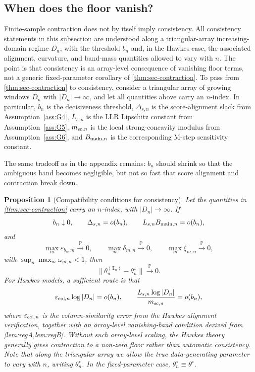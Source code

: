 \documentclass{statsoc}
\newtheorem{proposition}[proposition]{Proposition}
\newcommand{\1}{\mathbbm{1}}
\newcommand{\Tmax}{\mathfrak{T}}
\begin{document}
\subsection{When does the floor vanish?}\label{subsec:regimes}

Finite-sample contraction does not by itself imply consistency.  All consistency statements in this subsection are understood along a triangular-array increasing-domain regime \(D_n\), with the threshold \(b_n\) and, in the Hawkes case, the associated alignment, curvature, and band-mass quantities allowed to vary with \(n\). The point is that consistency is an array-level consequence of vanishing floor terms, not a generic fixed-parameter corollary of \cref{thm:sec-contraction}. To pass from \cref{thm:sec-contraction} to consistency, consider a triangular array of growing windows \(D_n\) with \(|D_n|\to\infty\), and let all quantities above carry an \(n\)-index. In particular, \(b_n\) is the decisiveness threshold, \(\Delta_{s,n}\) is the score-alignment slack from Assumption~\ref{ass:G4}, \(L_{s,n}\) is the LLR Lipschitz constant from Assumption~\ref{ass:G5}, \(m_{{\rm sc},n}\) is the local strong-concavity modulus from Assumption~\ref{ass:G6}, and \(B_{{\rm main},n}\) is the corresponding M-step sensitivity constant.

The same tradeoff as in the appendix remains: \(b_n\) should shrink so that the ambiguous band becomes negligible, but not so fast that score alignment and contraction break down.

\begin{proposition}[Compatibility conditions for consistency]\label{prop:compatibility}
Let the quantities in \cref{thm:sec-contraction} carry an \(n\)-index, with \(|D_n|\to\infty\). If
\[
b_n\downarrow 0,\qquad
\Delta_{s,n}=o(b_n),\qquad
L_{s,n}B_{{\rm main},n}=o(b_n),
\]
and
\[
\max_m \varepsilon_{b_n,m}\xrightarrow{\mathbb P}0,\qquad
\max_m \delta_{m,n}\xrightarrow{\mathbb P}0,\qquad
\max_m \xi_{m,n}\xrightarrow{\mathbb P}0,
\]
with \(\sup_n\max_m \omega_{m,n}<1\), then
\[
\|\theta_n^{(\Tmax_n)}-\theta_n^\star\|\xrightarrow{\mathbb P} 0.
\]
For Hawkes models, a sufficient route is that
\[
\varepsilon_{{\rm col},n}\log |D_n|=o(b_n),
\qquad
\frac{L_{s,n}\log|D_n|}{m_{{\rm sc},n}}=o(b_n),
\]
where \(\varepsilon_{{\rm col},n}\) is the column-similarity error from the Hawkes alignment verification, together with an array-level vanishing-band condition derived from \cref{lem:regA,lem:regB}. Without such array-level scaling, the Hawkes theory generally gives contraction to a non-zero floor rather than automatic consistency. Note that along the triangular array we allow the true data-generating parameter to vary with \(n\), writing \(\theta_n^\star\). In the fixed-parameter case, \(\theta_n^\star\equiv\theta^\star\).
\end{proposition}
\end{document}
